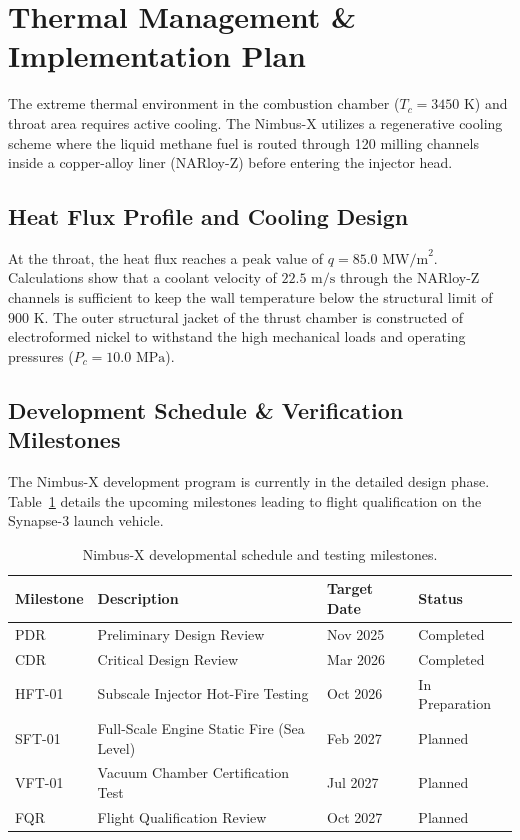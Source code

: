 \section{Thermal Management \& Implementation Plan}
The extreme thermal environment in the combustion chamber ($T_c = 3450\text{~K}$) and throat area requires active cooling. The Nimbus-X utilizes a regenerative cooling scheme where the liquid methane fuel is routed through 120 milling channels inside a copper-alloy liner (NARloy-Z) before entering the injector head.

\subsection{Heat Flux Profile and Cooling Design}
At the throat, the heat flux reaches a peak value of $q = 85.0\text{~MW/m}^2$. Calculations show that a coolant velocity of $22.5\text{~m/s}$ through the NARloy-Z channels is sufficient to keep the wall temperature below the structural limit of $900\text{~K}$.
The outer structural jacket of the thrust chamber is constructed of electroformed nickel to withstand the high mechanical loads and operating pressures ($P_c = 10.0\text{~MPa}$).

\subsection{Development Schedule \& Verification Milestones}
The Nimbus-X development program is currently in the detailed design phase. Table~\ref{tab:milestones} details the upcoming milestones leading to flight qualification on the Synapse-3 launch vehicle.

\begin{table}[H]
    \centering
    \small
    \caption{Nimbus-X developmental schedule and testing milestones.}
    \label{tab:milestones}
    \begin{tabularx}{\linewidth}{l X l l}
        \toprule
        \textbf{Milestone} & \textbf{Description} & \textbf{Target Date} & \textbf{Status} \\
        \midrule
        PDR & Preliminary Design Review & Nov 2025 & Completed \\
        CDR & Critical Design Review & Mar 2026 & Completed \\
        HFT-01 & Subscale Injector Hot-Fire Testing & Oct 2026 & In Preparation \\
        SFT-01 & Full-Scale Engine Static Fire (Sea Level) & Feb 2027 & Planned \\
        VFT-01 & Vacuum Chamber Certification Test & Jul 2027 & Planned \\
        FQR & Flight Qualification Review & Oct 2027 & Planned \\
        \bottomrule
    \end{tabularx}
\end{table}

